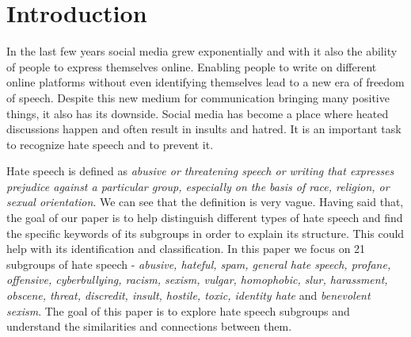 \documentclass[fleqn,moreauthors,10pt]{ds_report}
\affiliation{\textit{Advisors: Slavko Žitnik}}
\begin{document}
\flushbottom 

\maketitle 

\thispagestyle{empty} 


\section*{Introduction}
In the last few years social media grew exponentially and with it also the ability of people to express themselves online. Enabling people to write on different online platforms without even identifying themselves lead to a new era of freedom of speech. Despite this new medium for communication bringing many positive things, it also has its downside. Social media has become a place where heated discussions happen and often result in insults and hatred. It is an important task to recognize hate speech and to prevent it.

Hate speech is defined as \textit{abusive or threatening speech or writing that expresses prejudice against a particular group, especially on the basis of race, religion, or sexual orientation}\cite{hate_speech}. We can see that the definition is very vague. Having said that, the goal of our paper is to help distinguish different types of hate speech and find the specific keywords of its subgroups in order to explain its structure. This could help with its identification and classification. In this paper we focus on 21 subgroups of hate speech - \textit{abusive, hateful, spam, general hate speech, profane, offensive, cyberbullying, racism, sexism, vulgar, homophobic, slur, harassment, obscene, threat, discredit, insult, hostile, toxic, identity hate} and \textit{benevolent sexism}. The goal of this paper is to explore hate speech subgroups and understand the similarities and connections between them. 
\end{document}
